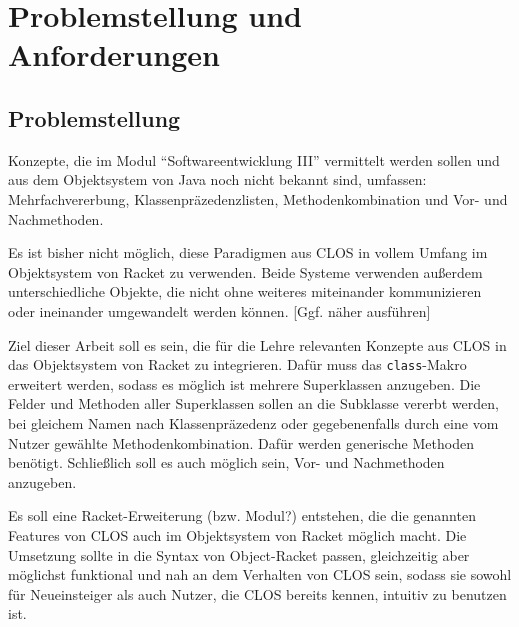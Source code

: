 \chapter{Problemstellung und Anforderungen}
\section{Problemstellung}
Konzepte, die im Modul ``Softwareentwicklung III'' vermittelt werden sollen und aus dem Objektsystem von Java noch nicht bekannt sind, umfassen: Mehrfachvererbung, Klassenpräzedenzlisten, Methodenkombination und Vor- und Nachmethoden.

Es ist bisher nicht möglich, diese Paradigmen aus CLOS in vollem Umfang im Objektsystem von Racket zu verwenden. Beide Systeme verwenden außerdem unterschiedliche Objekte, die nicht ohne weiteres miteinander kommunizieren oder ineinander umgewandelt werden können. [Ggf. näher ausführen]

Ziel dieser Arbeit soll es sein, die für die Lehre relevanten Konzepte aus CLOS in das Objektsystem von Racket zu integrieren. Dafür muss das \texttt{class}-Makro erweitert werden, sodass es möglich ist mehrere Superklassen anzugeben. Die Felder und Methoden aller Superklassen sollen an die Subklasse vererbt werden, bei gleichem Namen nach Klassenpräzedenz oder gegebenenfalls durch eine vom Nutzer gewählte Methodenkombination. Dafür werden generische Methoden benötigt. Schließlich soll es auch möglich sein, Vor- und Nachmethoden anzugeben.

Es soll eine Racket-Erweiterung (bzw. Modul?) entstehen, die die genannten Features von CLOS auch im Objektsystem von Racket möglich macht. Die Umsetzung sollte in die Syntax von Object-Racket passen, gleichzeitig aber möglichst funktional und nah an dem Verhalten von CLOS sein, sodass sie sowohl für Neueinsteiger als auch Nutzer, die CLOS bereits kennen, intuitiv zu benutzen ist.

